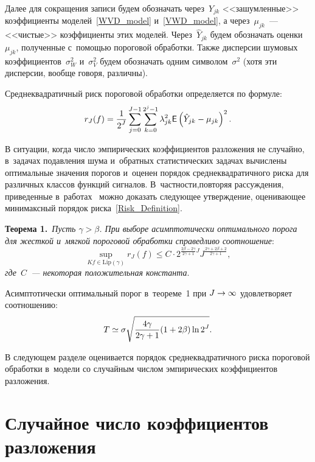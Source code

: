 \begin{multicols}{2}
Далее для сокращения записи будем обозначать через~$Y_{jk}$ <<зашумленные>> 
коэффициенты моделей~\eqref{WVD_model} и~\eqref{VWD_model}, а через~$\mu_{jk}$~--- 
<<чистые>> коэффициенты этих моделей. Через~$\hat{Y}_{jk}$ будем обозначать 
оценки~$\mu_{jk}$, полученные с~помощью пороговой обработки. Также дисперсии 
шумовых коэффициентов~$\sigma_W^2$ и~$\sigma_V^2$ будем обозначать одним 
символом~$\sigma^2$ (хотя эти дисперсии, вообще говоря, различны).

Среднеквадратичный риск пороговой обработки определяется по формуле:
\begin{equation}
\label{Risk_Definition}
r_J(f)=\displaystyle\frac{\displaystyle 1\mathstrut}{\displaystyle 2^J\mathstrut}\sum\limits_{j=0}^{J-1}\sum\limits_{k=0}^{2^j-1}\limits \lambda^2_{jk}
{\sf E}\left(\hat{Y}_{jk}-\mu_{jk}\right)^2.
\end{equation}

В ситуации, когда число эмпирических коэффициентов разложения не случайно, в~задачах 
подавления шума и~обратных статистических задачах вычислены оптимальные 
значения порогов и~оценен порядок среднеквадратичного риска для различных 
классов функций сигналов. В~част\-ности,\linebreak повторяя рассуждения, приведенные 
в~работах~\cite{AS98, DJ95, CB99} можно доказать следующее утверждение, 
оценивающее минимаксный порядок риска~\eqref{Risk_Definition}.

\smallskip

\noindent
\textbf{Теорема 1.}\ \textit{Пусть $\gamma>\beta$. При выборе асимптотически оптимального порога для жесткой и~мягкой пороговой обработки справедливо соотношение}:
$$
\sup\limits_{Kf\in \mathrm{Lip}(\gamma)}{r_J(f)}\leqslant 
C\cdot 2^{\frac{2\beta-2\gamma}{2\gamma+1}J}
J^{\frac{2\gamma+2\beta+2}{2\gamma+1}},
$$
\textit{где~$C$~--- некоторая положительная константа}.

\smallskip

Асимптотически оптимальный порог в~теореме~1 при $J\hm\to\infty$ 
удовлетворяет соотношению:
$$
T\simeq\sigma\sqrt{\displaystyle\frac{\displaystyle 4\gamma\mathstrut}{\displaystyle 2\gamma+1\mathstrut}(1+2\beta)\ln2^J}.
$$


В следующем разделе оценивается порядок среднеквадратичного 
риска пороговой обработки в~модели со случайным числом эмпирических 
коэффициентов разложения.

\vspace*{-6pt}


\section{Случайное число коэффициентов разложения}


\end{multicols}
